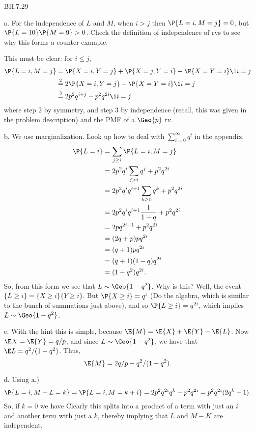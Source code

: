 
\setcounter{theorem}{28}
\begin{exercise} BH.7.29
\begin{solution}
a. For the independence of $L$ and $M$, when $i>j$ then $\P{L=i, M=j}=0$, but $\P{L=10}\P{M=9} > 0$. Check the definition of independence of rvs to see why this forms a counter example.

This must be clear: for $i\leq j$,
\begin{align*}
\P{L=i, M=j}
  &= \P{X=i, Y=j} + \P{X=j, Y=i} - \P{X=Y=i}\1{i=j}\\
  &\stackrel{2}{=} 2\P{X=i, Y=j} - \P{X=Y=i} \1{i=j} \\
  &\stackrel{3}{=} 2 p^{2} q^{i+j} - p^{2}q^{2i}\1{i=j}\\
\end{align*}
where step $2$ by symmetry, and step 3 by independence (recall, this was given in the problem description) and the PMF of a $\Geo{p}$ rv.

b. We use marginalization. Look up how to deal with $\sum_{i=0}^{\infty} q^{i}$ in the appendix.
\begin{align*}
  \P{L=i}
  &= \sum_{j\geq i} \P{L=i, M=j} \\
  &= 2p^2q^i\sum_{j> i} q^j + p^2q^{2i} \\
  &= 2p^2q^i q^{i+1}\sum_{k\geq 0} q^k + p^2q^{2i} \\
  &= 2p^2q^i q^{i+1}\frac{1}{1-q} + p^2q^{2i} \\
  &= 2p q^{2i+1} + p^2q^{2i} \\
  &= (2 q + p)pq^{2i} \\
  &= (q + 1)pq^{2i} \\
  &= (q + 1)(1-q)q^{2i} \\
  &= (1-q^{2})q^{2i}.
\end{align*}
So, from this form we see that $L\sim\Geo{1-q^{2}}$. Why is this? Well, the event $\{L\geq i\} = \{X\geq i\}\{Y\geq i\}$. But $\P{X\geq i} = q^{i}$ (Do the algebra, which is similar to the bunch of summations just above), and so $\P{L\geq i} = q^{2i}$, which implies $L\sim \Geo{1-q^{2}}$.

c. With the hint this is simple, because $\E{M} = \E{X}+\E{Y}- \E{L}$. Now $\E X = \E{Y} = q/p$, and since $L\sim \Geo{1-q^2}$, we have that $\E L = q^2/(1-q^{2})$. Thus,
\begin{equation*}
\E{M} = 2 q/ p - q^2/(1-q^2).
\end{equation*}

d. Using a.)
\begin{align*}
  \P{L=i, M-L=k} = \P{L=i, M=k+i} = 2p^2q^{2i} q^k - p^2q^{2i}=p^2q^{2i}(2q^k-1).
\end{align*}
So, if $k=0$ we have
Clearly this splits into a product of a term with just an $i$ and another term with just a $k$, thereby implying that $L$ and $M-K$ are independent.
\end{solution}



\end{exercise}

